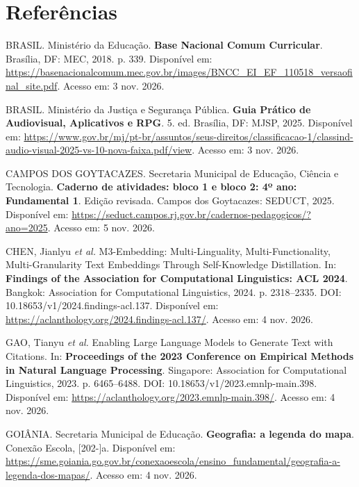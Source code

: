 \chapter*{Referências}
\begingroup\SingleSpacing\setlength{\parindent}{0pt}\setlength{\parskip}{12pt}

BRASIL. Ministério da Educação. \textbf{Base Nacional Comum Curricular}. Brasília, DF: MEC, 2018. p. 339. Disponível em: \url{https://basenacionalcomum.mec.gov.br/images/BNCC_EI_EF_110518_versaofinal_site.pdf}. Acesso em: 3 nov. 2026.

BRASIL. Ministério da Justiça e Segurança Pública. \textbf{Guia Prático de Audiovisual, Aplicativos e RPG}. 5. ed. Brasília, DF: MJSP, 2025. Disponível em: \url{https://www.gov.br/mj/pt-br/assuntos/seus-direitos/classificacao-1/classind-audio-visual-2025-vs-10-nova-faixa.pdf/view}. Acesso em: 3 nov. 2026.

CAMPOS DOS GOYTACAZES. Secretaria Municipal de Educação, Ciência e Tecnologia. \textbf{Caderno de atividades: bloco 1 e bloco 2: 4º ano: Fundamental 1}. Edição revisada. Campos dos Goytacazes: SEDUCT, 2025. Disponível em: \url{https://seduct.campos.rj.gov.br/cadernos-pedagogicos/?ano=2025}. Acesso em: 5 nov. 2026.

CHEN, Jianlyu \textit{et al.} M3-Embedding: Multi-Linguality, Multi-Functionality, Multi-Granularity Text Embeddings Through Self-Knowledge Distillation. In: \textbf{Findings of the Association for Computational Linguistics: ACL 2024}. Bangkok: Association for Computational Linguistics, 2024. p. 2318--2335. DOI: 10.18653/v1/2024.findings-acl.137. Disponível em: \url{https://aclanthology.org/2024.findings-acl.137/}. Acesso em: 4 nov. 2026.

GAO, Tianyu \textit{et al.} Enabling Large Language Models to Generate Text with Citations. In: \textbf{Proceedings of the 2023 Conference on Empirical Methods in Natural Language Processing}. Singapore: Association for Computational Linguistics, 2023. p. 6465--6488. DOI: 10.18653/v1/2023.emnlp-main.398. Disponível em: \url{https://aclanthology.org/2023.emnlp-main.398/}. Acesso em: 4 nov. 2026.

GOIÂNIA. Secretaria Municipal de Educação. \textbf{Geografia: a legenda do mapa}. Conexão Escola, [202-]a. Disponível em: \url{https://sme.goiania.go.gov.br/conexaoescola/ensino_fundamental/geografia-a-legenda-dos-mapas/}. Acesso em: 4 nov. 2026.

